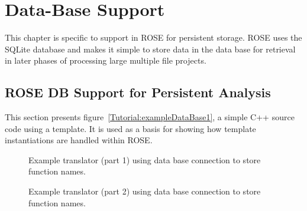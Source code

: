 \chapter{Data-Base Support}

    This chapter is specific to support in ROSE for persistent storage.
ROSE uses the SQLite database and makes it simple to store data in the
data base for retrieval in later phases of processing large multiple file projects.


\section{ROSE DB Support for Persistent Analysis}

   This section presents figure~\ref{Tutorial:exampleDataBase1}, a simple 
C++ source code using a template. It is used as a basis for showing how 
template instantiations are handled within ROSE.

\begin{figure}[!h]
{\indent
{\mySmallFontSize


\begin{latexonly}
   
\end{latexonly}

\begin{htmlonly}
   
\end{htmlonly}

}
}
\caption{Example translator (part 1) using data base connection to store function names.}
\label{Tutorial:exampleDataBaseTranslator}
\end{figure}

\begin{figure}[!h]
{\indent
{\mySmallFontSize


\begin{latexonly}
   
\end{latexonly}

\begin{htmlonly}
   
\end{htmlonly}

}
}
\caption{Example translator (part 2) using data base connection to store function names.}
\label{Tutorial:exampleDataBaseTranslator}
\end{figure}


